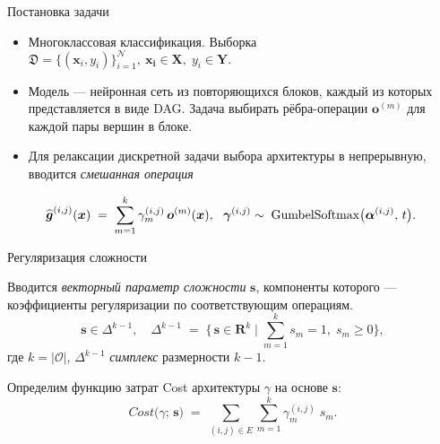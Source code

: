 \documentclass{beamer}
\begin{document}
\begin{frame}{Постановка задачи} %
\begin{itemize}

    \item Многоклассовая классификация. Выборка $
    \mathfrak D = \{(\boldsymbol{x}_i, y_i)\}_{i=1}^{\mathcal N},
    \ \boldsymbol{x_i} \in \mathbf X,\; y_i \in \mathbf Y. $

    \vspace{10pt}
    
    \item Модель --- нейронная сеть из повторяющихся блоков, каждый из которых представляется в виде DAG. Задача выбирать рёбра-операции $\boldsymbol{o}^{(m)}$ для каждой пары вершин в блоке. 
    
    \vspace{10pt}
    
    \item Для релаксации дискретной задачи выбора архитектуры в непрерывную, вводится \textit{смешанная операция}
    
    $$\hspace{-20pt}
    \widehat{\boldsymbol{g}}^{(i,j)}(\boldsymbol x) 
    \;=\; 
    \sum_{m=1}^k 
    \gamma^{(i,j)}_m \,\boldsymbol{o}^{(m)}(\boldsymbol x),
\ \ 
    \boldsymbol{\gamma}^{(i,j)}  \sim\; 
    \mathrm{GumbelSoftmax}\bigl(\boldsymbol{\alpha}^{(i,j)},\,t\bigr).
$$
\end{itemize}


    
\end{frame}



\begin{frame}{Регуляризация сложности}


Вводится \textit{векторный параметр сложности} $\boldsymbol{s}$, компоненты которого --- коэффициенты регуляризации по соответствующим операциям.
$$\boldsymbol{s} \in \Delta^{k-1}, \quad
\Delta^{k-1} \;=\; \bigl\{\,\boldsymbol{s}\in \boldsymbol R^k\mid \sum_{m=1}^k s_m = 1,\; s_m\ge0 \bigr\},$$
где $k = |\mathcal O|$,  $ \Delta^{k-1}$ \textit{симплекс} размерности $k-1$.

\vspace{10pt}

Определим функцию затрат Cost архитектуры $\gamma$ на основе $\boldsymbol{s}$:
$$Cost\bigl(\gamma;\,\boldsymbol{s}\bigr)
    \;=\; 
    \sum_{(i,j)\in E} \sum_{m=1}^k 
    \gamma^{(i,j)}_m \;s_m.$$

\end{frame}
\end{document}
